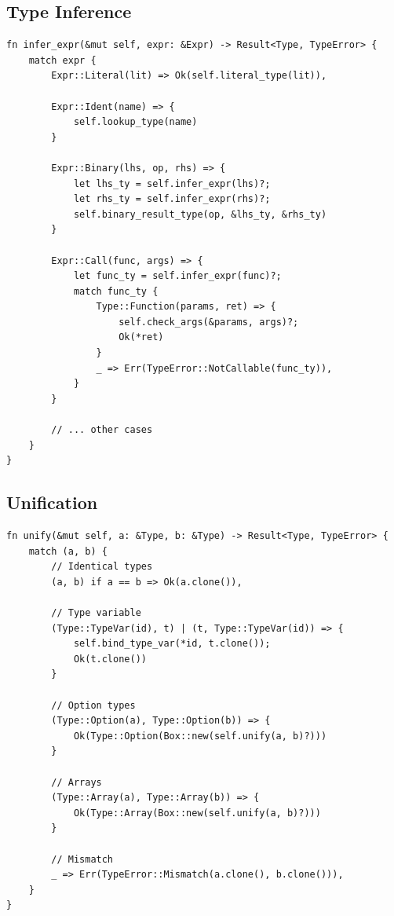 \subsection{Type Inference}

\begin{lstlisting}[language={}]
fn infer_expr(&mut self, expr: &Expr) -> Result<Type, TypeError> {
    match expr {
        Expr::Literal(lit) => Ok(self.literal_type(lit)),

        Expr::Ident(name) => {
            self.lookup_type(name)
        }

        Expr::Binary(lhs, op, rhs) => {
            let lhs_ty = self.infer_expr(lhs)?;
            let rhs_ty = self.infer_expr(rhs)?;
            self.binary_result_type(op, &lhs_ty, &rhs_ty)
        }

        Expr::Call(func, args) => {
            let func_ty = self.infer_expr(func)?;
            match func_ty {
                Type::Function(params, ret) => {
                    self.check_args(&params, args)?;
                    Ok(*ret)
                }
                _ => Err(TypeError::NotCallable(func_ty)),
            }
        }

        // ... other cases
    }
}
\end{lstlisting}

\subsection{Unification}

\begin{lstlisting}[language={}]
fn unify(&mut self, a: &Type, b: &Type) -> Result<Type, TypeError> {
    match (a, b) {
        // Identical types
        (a, b) if a == b => Ok(a.clone()),

        // Type variable
        (Type::TypeVar(id), t) | (t, Type::TypeVar(id)) => {
            self.bind_type_var(*id, t.clone());
            Ok(t.clone())
        }

        // Option types
        (Type::Option(a), Type::Option(b)) => {
            Ok(Type::Option(Box::new(self.unify(a, b)?)))
        }

        // Arrays
        (Type::Array(a), Type::Array(b)) => {
            Ok(Type::Array(Box::new(self.unify(a, b)?)))
        }

        // Mismatch
        _ => Err(TypeError::Mismatch(a.clone(), b.clone())),
    }
}
\end{lstlisting}

